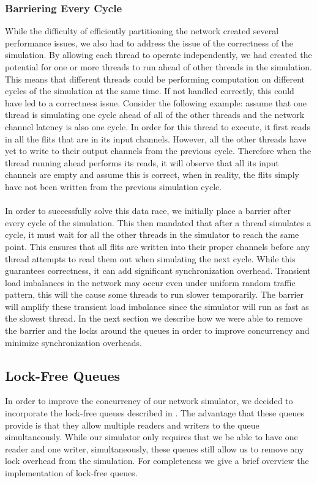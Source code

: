 \documentclass{article}
\begin{document}
\begin{multicols}{2}
\subsubsection{Barriering Every Cycle}
While the difficulty of efficiently partitioning the network created
several performance issues, we also had to address the issue of the
correctness of the simulation.  By allowing each thread to operate
independently, we had created the potential for one or more threads to run
ahead of other threads in the simulation.  This means that different
threads could be performing computation on different cycles of the
simulation at the same time.  If not handled correctly, this could have
led to a correctness issue.  Consider the following example: assume that
one thread is simulating one cycle ahead of all of the other threads and the network channel latency is also one cycle.  In
order for this thread to execute, it first reads in all the flits that are
in its input channels.  However, all the other threads have yet to write
to their output channels from the previous cycle.  Therefore when the thread running ahead
performs its reads, it will observe that all its input channels are empty
and assume this is correct, when in reality, the flits simply have not
been written from the previous simulation cycle.\\
~\\
In order to successfully solve this data race, we initially place a
barrier after every cycle of the simulation.  This then mandated that
after a thread simulates a cycle, it must wait for all the other threads
in the simulator to reach the same point.  This ensures that all flits are
written into their proper channels before any thread attempts to read them
out when simulating the next cycle.  While this guarantees correctness, it
can add significant
synchronization overhead. Transient load imbalances in the network may occur even under uniform random traffic pattern, this will the cause some threads to run slower temporarily. The barrier will amplify these transient load imbalance since the simulator will run as fast as the slowest thread. In the next section we describe how we were
able to remove the barrier and the locks around the queues in order to
improve concurrency and minimize synchronization overheads.

\subsection{Lock-Free Queues}
In order to improve the concurrency of our network simulator, we decided
to incorporate the lock-free queues described in \cite{LF}.  The advantage
that these queues provide is that they allow multiple readers and writers
to the queue simultaneously.  While our simulator only requires that we
be able to have one reader and one writer, simultaneously, these queues
still allow us to remove any lock overhead from the simulation.  For
completeness we give a brief overview the implementation of lock-free
queues.


\end{multicols}
\end{document}
